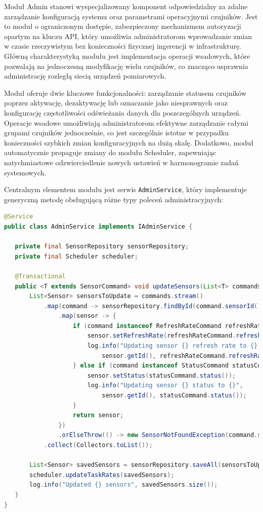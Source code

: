\documentclass[a4paper,12pt,openany]{book}
\begin{document}
Moduł Admin stanowi wyspecjalizowany komponent odpowiedzialny za zdalne zarządzanie konfiguracją systemu oraz parametrami operacyjnymi czujników. Jest to moduł o ograniczonym dostępie, zabezpieczony mechanizmem autoryzacji opartym na kluczu API, który umożliwia administratorom wprowadzanie zmian w czasie rzeczywistym bez konieczności fizycznej ingerencji w infrastrukturę. Główną charakterystyką modułu jest implementacja operacji wsadowych, które pozwalają na jednoczesną modyfikację wielu czujników, co znacząco usprawnia administrację rozległą siecią urządzeń pomiarowych.

Moduł oferuje dwie kluczowe funkcjonalności: zarządzanie statusem czujników poprzez aktywację, dezaktywację lub oznaczanie jako niesprawnych oraz konfigurację częstotliwości odświeżania danych dla poszczególnych urządzeń. Operacje wsadowe umożliwiają administratorom efektywne zarządzanie całymi grupami czujników jednocześnie, co jest szczególnie istotne w przypadku konieczności szybkich zmian konfiguracyjnych na dużą skalę. Dodatkowo, moduł automatycznie propaguje zmiany do modułu Scheduler, zapewniając natychmiastowe odzwierciedlenie nowych ustawień w harmonogramie zadań systemowych.

Centralnym elementem modułu jest serwis \texttt{AdminService}, który implementuje generyczną metodę obsługującą różne typy poleceń administracyjnych:

\begin{lstlisting}[language=java,caption={Serwis Admin z metodą aktualizacji wsadowej},label={lst:admin-service}]
@Service
public class AdminService implements IAdminService {

   private final SensorRepository sensorRepository;
   private final Scheduler scheduler;

   @Transactional
   public <T extends SensorCommand> void updateSensors(List<T> commands) {
       List<Sensor> sensorsToUpdate = commands.stream()
           .map(command -> sensorRepository.findById(command.sensorId())
               .map(sensor -> {
                   if (command instanceof RefreshRateCommand refreshRateCommand) {
                       sensor.setRefreshRate(refreshRateCommand.refreshRate());
                       log.info("Updating sensor {} refresh rate to {} seconds",
                           sensor.getId(), refreshRateCommand.refreshRate());
                   } else if (command instanceof StatusCommand statusCommand) {
                       sensor.setStatus(statusCommand.status());
                       log.info("Updating sensor {} status to {}",
                           sensor.getId(), statusCommand.status());
                   }
                   return sensor;
               })
               .orElseThrow(() -> new SensorNotFoundException(command.sensorId())))
           .collect(Collectors.toList());

       List<Sensor> savedSensors = sensorRepository.saveAll(sensorsToUpdate);
       scheduler.updateTaskRates(savedSensors);
       log.info("Updated {} sensors", savedSensors.size());
   }
}
\end{lstlisting}
\end{document}
